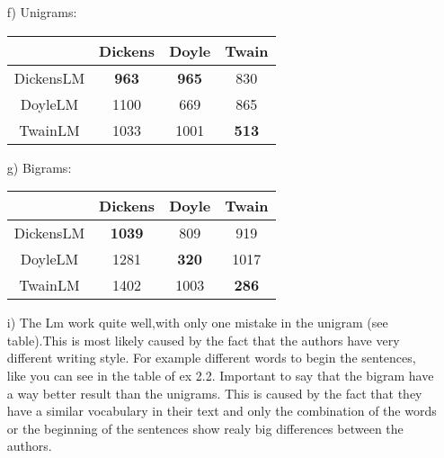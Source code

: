 \documentclass{article}
\begin{document}
\begin{itemize}
\begin{table}[h]
\begin{adjustbox}{width=\columnwidth,center}
\begin{tabular}{|c c| c c|| c c| c c|| c c| c c |}
\end{tabular}
\end{adjustbox}
\end{table}
\item[f)]
Unigrams:
\begin{table}[h]
\begin{adjustbox}{width=\columnwidth,center}
\begin{tabular}{|c||c|c|c|}
\hline&Dickens&Doyle&Twain\\\hline
DickensLM&\textbf{963}&\textbf{965}&830\\
DoyleLM&1100&669&865\\
TwainLM&1033&1001&\textbf{513}\\\hline
	
\end{tabular}
\end{adjustbox}
\end{table}
\item[g)]
Bigrams:
\begin{table}[h]
\begin{adjustbox}{width=\columnwidth,center}
\begin{tabular}{|c||c|c|c|}
\hline&Dickens&Doyle&Twain\\\hline
DickensLM&\textbf{1039}&809&919\\
DoyleLM&1281&\textbf{320}&1017\\
TwainLM&1402&1003&\textbf{286}\\\hline
	
\end{tabular}
\end{adjustbox}
\end{table}
\item[i)]
The Lm work quite well,with only one mistake in the unigram (see table).This is most likely caused by the fact that the authors have very different writing style. For example different words to begin the sentences, like you can see in the table of ex 2.2. Important to say that the bigram have a way better result than the unigrams. This is caused by the fact that they have a similar vocabulary in their text and only the combination of the words or the beginning of the sentences show realy big differences between the authors.
\end{itemize}

\end{document}
